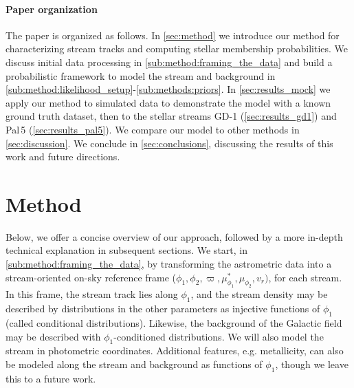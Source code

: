 \documentclass[twocolumn, linenumbers]{aastex631}
\newcommand{\stream}[1]{#1}
\newcommand{\parallax}{\varpi}
\begin{document}
    \paragraph{Paper organization}

        The paper is organized as follows.  In \autoref{sec:method} we introduce
        our method for characterizing stream tracks and computing stellar
        membership probabilities.  We discuss initial data processing in
        \autoref{sub:method:framing_the_data} and build a probabilistic
        framework to model the stream and background in
        \autoref{sub:method:likelihood_setup}-\autoref{sub:methods:priors}.  In
        \autoref{sec:results_mock} we apply our method to simulated data to
        demonstrate the model with a known ground truth dataset, then to the
        stellar streams \stream{GD-1} (\autoref{sec:results_gd1}) and
        \stream{Pal\,5} (\autoref{sec:results_pal5}).  We compare our model to
        other methods in \autoref{sec:discussion}.  We conclude in
        \autoref{sec:conclusions}, discussing the results of this work and
        future directions.


\newpage
\section{Method} \label{sec:method}

    Below, we offer a concise overview of our approach, followed by a more
    in-depth technical explanation in subsequent sections.  We start, in
    \autoref{sub:method:framing_the_data}, by transforming the astrometric data
    into a stream-oriented on-sky reference frame ($\phi_1, \phi_2, \parallax,
    \mu_{\phi_1}^*, \mu_{\phi_2}, v_r)$, for each stream.  In this frame, the
    stream track lies along $\phi_1$, and the stream density may be described by
    distributions in the other parameters as injective functions of $\phi_1$
    (called conditional distributions).  Likewise, the background of the
    Galactic field may be described with $\phi_1$-conditioned distributions.  We
    will also model the stream in photometric coordinates.  Additional features,
    e.g.  metallicity, can also be modeled along the stream and background as
    functions of $\phi_1$, though we leave this to a future work.
\end{document}
